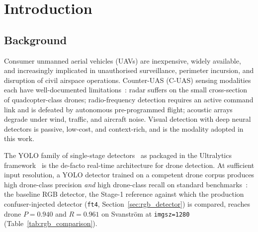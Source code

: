\chapter{Introduction}
\label{ch:introduction}

\section{Background}

Consumer unmanned aerial vehicles (UAVs) are inexpensive, widely available, and increasingly implicated in unauthorised surveillance, perimeter incursion, and disruption of civil airspace operations. Counter-UAS (C-UAS) sensing modalities each have well-documented limitations~\cite{shi2018counteruas}: radar suffers on the small cross-section of quadcopter-class drones; radio-frequency detection requires an active command link and is defeated by autonomous pre-programmed flight; acoustic arrays degrade under wind, traffic, and aircraft noise. Visual detection with deep neural detectors is passive, low-cost, and context-rich, and is the modality adopted in this work.

The YOLO family of single-stage detectors~\cite{redmon2016yolo} as packaged in the Ultralytics framework~\cite{ultralytics2024} is the de-facto real-time architecture for drone detection. At sufficient input resolution, a YOLO detector trained on a competent drone corpus produces high drone-class precision \emph{and} high drone-class recall on standard benchmarks~\cite{svanstrom2021real,jiang2021antiuav}: the baseline RGB detector, the Stage-1 reference against which the production confuser-injected detector (\texttt{ft4}, Section~\ref{sec:rgb_detector}) is compared, reaches drone $P=0.940$ and $R=0.961$ on Svanstr\"om at \texttt{imgsz=1280} (Table~\ref{tab:rgb_comparison}).

